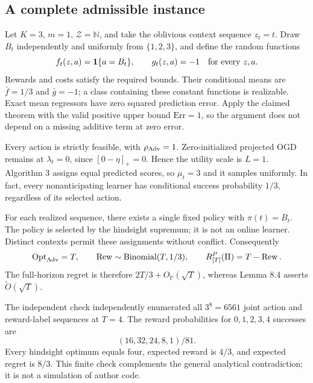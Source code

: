 \documentclass[10pt]{article}
\begin{document}
\subsection*{A complete admissible instance}
Let \(K=3\), \(m=1\), \(\mathcal Z=\mathbb N\), and take the oblivious context sequence \(z_t=t\). Draw \(B_t\) independently and uniformly from \(\{1,2,3\}\), and define the random functions \[f_t(z,a)=\mathbf1\{a=B_t\},\qquad g_t(z,a)=-1
 \quad\hbox{for every }z,a.\] Rewards and costs satisfy the required bounds. Their conditional means are \(\bar f=1/3\) and \(\bar g=-1\); a class containing these constant functions is realizable. Exact mean regressors have zero squared prediction error. Apply the claimed theorem with the valid positive upper bound \(\mathrm{Err}=1\), so the argument does not depend on a missing additive term at zero error.\par
Every action is strictly feasible, with \(\rho_{\rm Adv}=1\). Zero-initialized projected OGD remains at \(\lambda_t=0\), since \([0-\eta]_+=0\). Hence the utility scale is \(L=1\). Algorithm 3 assigns equal predicted scores, so \(\mu_t=3\) and it samples uniformly. In fact, every nonanticipating learner has conditional success probability \(1/3\), regardless of its selected action.\par
For each realized sequence, there exists a single fixed policy with \(\pi(t)=B_t\). The policy is selected by the hindsight supremum; it is not an online learner. Distinct contexts permit these assignments without conflict. Consequently \[\operatorname{Opt}_{\rm Adv}=T,\qquad
 \operatorname{Rew}\sim\operatorname{Binomial}(T,1/3),\qquad
 R^P_{[T]}(\Pi)=T-\operatorname{Rew}.\] The full-horizon regret is therefore \(2T/3+O_{\mathbb P}(\sqrt T)\), whereas Lemma 8.4 asserts \(\widetilde O(\sqrt T)\).\par
The independent check independently enumerated all \(3^8=6561\) joint action and reward-label sequences at \(T=4\). The reward probabilities for \(0,1,2,3,4\) successes are \[(16,32,24,8,1)/81.\] Every hindsight optimum equals four, expected reward is \(4/3\), and expected regret is \(8/3\). This finite check complements the general analytical contradiction; it is not a simulation of author code.\par
\end{document}
